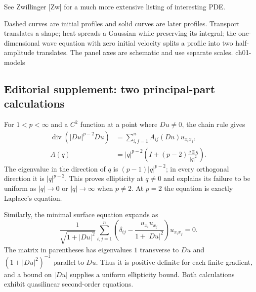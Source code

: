 See Zwillinger [Zw] for a much more extensive listing of interesting PDE.


{Dashed curves are initial profiles and solid curves are later profiles. Transport translates a shape; heat spreads a Gaussian while preserving its integral; the one-dimensional wave equation with zero initial velocity splits a profile into two half-amplitude translates. The panel axes are schematic and use separate scales.}
{ch01-models}

\subsection*{Editorial supplement: two principal-part calculations}
For $1<p<\infty$ and a $C^2$ function at a point where $Du\ne0$, the
chain rule gives
\begin{align*}
 \operatorname{div}(|Du|^{p-2}Du)
 &=\sum_{i,j=1}^n A_{ij}(Du)u_{x_ix_j},\\
 A(q)&=|q|^{p-2}\left(I+(p-2)\frac{q\otimes q}{|q|^2}\right).
\end{align*}
The eigenvalue in the direction of $q$ is $(p-1)|q|^{p-2}$; in every
orthogonal direction it is $|q|^{p-2}$. This proves ellipticity at $q\ne0$
and explains its failure to be uniform as $|q|\to0$ or $|q|\to\infty$
when $p\ne2$. At $p=2$ the equation is exactly Laplace's equation.

Similarly, the minimal surface equation expands as
\[
 \frac1{\sqrt{1+|Du|^2}}
 \sum_{i,j=1}^n\left(\delta_{ij}-\frac{u_{x_i}u_{x_j}}{1+|Du|^2}\right)
 u_{x_ix_j}=0.
\]
The matrix in parentheses has eigenvalues $1$ transverse to $Du$ and
$(1+|Du|^2)^{-1}$ parallel to $Du$. Thus it is positive definite for each
finite gradient, and a bound on $|Du|$ supplies a uniform ellipticity bound.
Both calculations exhibit quasilinear second-order equations.
\par\Needspace{65mm}

